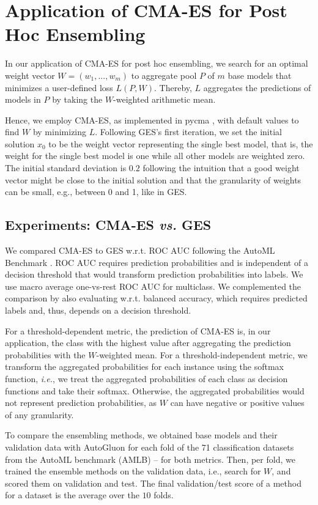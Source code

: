 \documentclass[11pt]{article}
\begin{document}
\section{Application of CMA-ES for Post Hoc Ensembling}
\label{sec/cma-es_app}
In our application of CMA-ES for post hoc ensembling, we search for an optimal weight vector $W = (w_1, ..., w_{m})$ to aggregate pool $P$ of $m$ base models that minimizes a user-defined loss $L(P, W)$. Thereby, $L$ aggregates the predictions of models in $P$ by taking the $W$-weighted arithmetic mean.  

Hence, we employ CMA-ES, as implemented in pycma \citep{hansen2019pycma}, with default values to find $W$ by minimizing $L$. 
Following GES's first iteration, we set the initial solution $x_0$ to be the weight vector representing the single best model, that is, the weight for the single best model is one while all other models are weighted zero. 
The initial standard deviation is $0.2$ following the intuition that a good weight vector might be close to the initial solution and that the granularity of weights can be small, e.g., between 0 and 1, like in GES. 



\subsection{Experiments: CMA-ES \emph{vs.} GES}
\label{sec/cma-es-compare}
We compared CMA-ES to GES w.r.t.{} ROC AUC following the AutoML Benchmark \citep{automl_benchmark_2022}. 
ROC AUC requires prediction probabilities and is independent of a decision threshold that would transform prediction probabilities into labels.  We use macro average one-vs-rest ROC AUC for multiclass. 
We complemented the comparison by also evaluating w.r.t.{} balanced accuracy, which requires predicted labels and, thus, depends on a decision threshold.

For a threshold-dependent metric, the prediction of CMA-ES is, in our application, the class with the highest value after aggregating the prediction probabilities with the $W$-weighted mean. 
For a threshold-independent metric, we transform the aggregated probabilities for each instance using the softmax function, \emph{i.e.}, we treat the aggregated probabilities of each class as decision functions and take their softmax.
Otherwise, the aggregated probabilities would not represent prediction probabilities, as $W$ can have negative or positive values of any granularity. 

To compare the ensembling methods, we obtained base models and their validation data with AutoGluon \citep{ag1} for each fold of the 71 classification datasets from the AutoML benchmark (AMLB) \citep{automl_benchmark_2022} -- for both metrics.
Then, per fold, we trained the ensemble methods on the validation data, i.e., search for $W$, and scored them on validation and test. The final validation/test score of a method for a dataset is the average over the $10$ folds.
\end{document}
